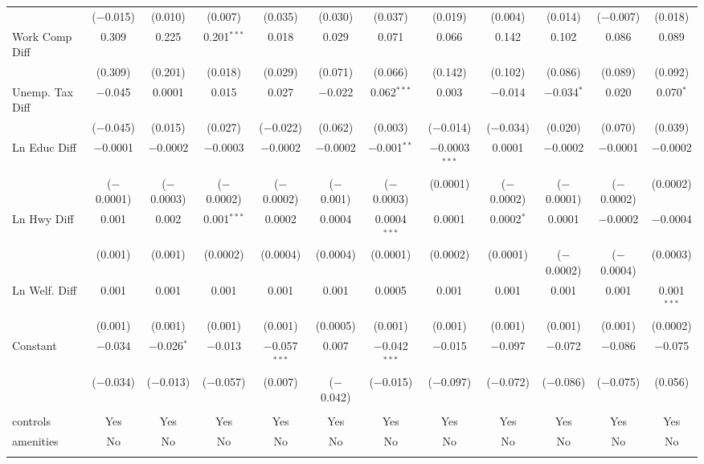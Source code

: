 \begin{table}[!htbp]
\begin{tabular}{@{\extracolsep{5pt}}lccccccccccc}
  & ($-$0.015) & (0.010) & (0.007) & (0.035) & (0.030) & (0.037) & (0.019) & (0.004) & (0.014) & ($-$0.007) & (0.018) \\ 
  Work Comp Diff & 0.309 & 0.225 & 0.201$^{***}$ & 0.018 & 0.029 & 0.071 & 0.066 & 0.142 & 0.102 & 0.086 & 0.089 \\ 
  & (0.309) & (0.201) & (0.018) & (0.029) & (0.071) & (0.066) & (0.142) & (0.102) & (0.086) & (0.089) & (0.092) \\ 
  Unemp. Tax Diff & $-$0.045 & 0.0001 & 0.015 & 0.027 & $-$0.022 & 0.062$^{***}$ & 0.003 & $-$0.014 & $-$0.034$^{*}$ & 0.020 & 0.070$^{*}$ \\ 
  & ($-$0.045) & (0.015) & (0.027) & ($-$0.022) & (0.062) & (0.003) & ($-$0.014) & ($-$0.034) & (0.020) & (0.070) & (0.039) \\ 
  Ln Educ Diff & $-$0.0001 & $-$0.0002 & $-$0.0003 & $-$0.0002 & $-$0.0002 & $-$0.001$^{**}$ & $-$0.0003$^{***}$ & 0.0001 & $-$0.0002 & $-$0.0001 & $-$0.0002 \\ 
  & ($-$0.0001) & ($-$0.0003) & ($-$0.0002) & ($-$0.0002) & ($-$0.001) & ($-$0.0003) & (0.0001) & ($-$0.0002) & ($-$0.0001) & ($-$0.0002) & (0.0002) \\ 
  Ln Hwy Diff & 0.001 & 0.002 & 0.001$^{***}$ & 0.0002 & 0.0004 & 0.0004$^{***}$ & 0.0001 & 0.0002$^{*}$ & 0.0001 & $-$0.0002 & $-$0.0004 \\ 
  & (0.001) & (0.001) & (0.0002) & (0.0004) & (0.0004) & (0.0001) & (0.0002) & (0.0001) & ($-$0.0002) & ($-$0.0004) & (0.0003) \\ 
  Ln Welf. Diff & 0.001 & 0.001 & 0.001 & 0.001 & 0.001 & 0.0005 & 0.001 & 0.001 & 0.001 & 0.001 & 0.001$^{***}$ \\ 
  & (0.001) & (0.001) & (0.001) & (0.001) & (0.0005) & (0.001) & (0.001) & (0.001) & (0.001) & (0.001) & (0.0002) \\ 
  Constant & $-$0.034 & $-$0.026$^{*}$ & $-$0.013 & $-$0.057$^{***}$ & 0.007 & $-$0.042$^{***}$ & $-$0.015 & $-$0.097 & $-$0.072 & $-$0.086 & $-$0.075 \\ 
  & ($-$0.034) & ($-$0.013) & ($-$0.057) & (0.007) & ($-$0.042) & ($-$0.015) & ($-$0.097) & ($-$0.072) & ($-$0.086) & ($-$0.075) & (0.056) \\ 
 \hline \\[-1.8ex] 
controls & Yes & Yes & Yes & Yes & Yes & Yes & Yes & Yes & Yes & Yes & Yes \\ 
amenities & No & No & No & No & No & No & No & No & No & No & No \\ 
\hline \\[-1.8ex] 

\end{tabular}
\end{table}
